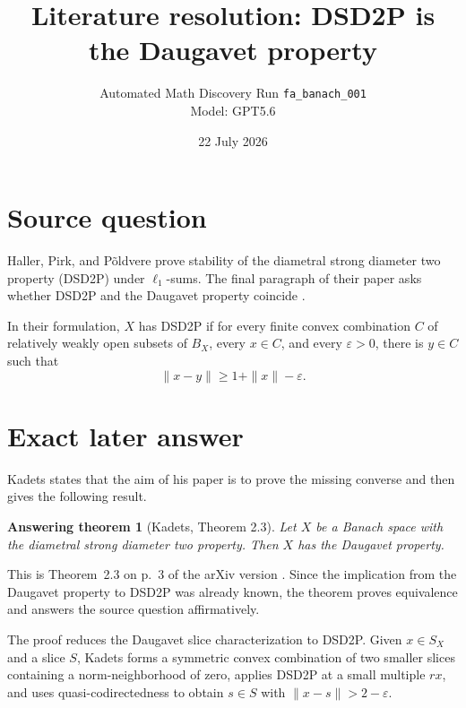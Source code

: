\documentclass[11pt]{article}
\title{Literature resolution: DSD2P is the Daugavet property}
\author{Automated Math Discovery Run \texttt{fa\_banach\_001}\\Model: GPT5.6}
\date{22 July 2026}
\newtheorem*{answer}{Answering theorem}
\begin{document}
\maketitle
\begin{center}
\end{center}

\section*{Source question}
Haller, Pirk, and P\~oldvere prove stability of the diametral strong diameter
two property (DSD2P) under $\ell_1$-sums.  The final paragraph of their paper
asks whether DSD2P and the Daugavet property coincide
\cite[p.~4, final paragraph]{HPP}.

In their formulation, $X$ has DSD2P if for every finite convex combination
$C$ of relatively weakly open subsets of $B_X$, every $x\in C$, and every
$\varepsilon>0$, there is $y\in C$ such that
\[
 \|x-y\|\geq 1+\|x\|-\varepsilon.
\]

\section*{Exact later answer}
Kadets states that the aim of his paper is to prove the missing converse and
then gives the following result.

\begin{answer}[Kadets, Theorem 2.3]
Let $X$ be a Banach space with the diametral strong diameter two property.
Then $X$ has the Daugavet property.
\end{answer}

This is Theorem~2.3 on p.~3 of the arXiv version
\cite[Theorem~2.3, p.~3]{Kadets}.  Since the implication from the Daugavet
property to DSD2P was already known, the theorem proves equivalence and
answers the source question affirmatively.

The proof reduces the Daugavet slice characterization to DSD2P. Given
$x\in S_X$ and a slice $S$, Kadets forms a symmetric convex combination of
two smaller slices containing a norm-neighborhood of zero, applies DSD2P at
a small multiple $rx$, and uses quasi-codirectedness to obtain $s\in S$ with
$\|x-s\|>2-\varepsilon$.
\end{document}
